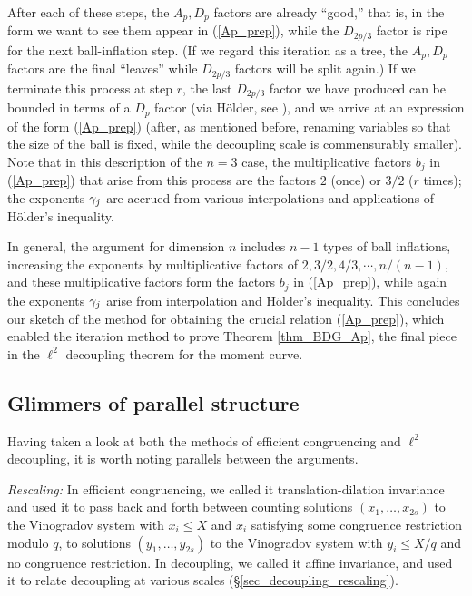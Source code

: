 \documentclass[brochure,english,12pt]{bourbaki}%
\begin{document}
After each of these steps, the $A_p,D_p$ factors are already ``good,'' that is, in the form we want to see them appear in (\ref{Ap_prep}), while the $D_{2p/3}$ factor is ripe for the next ball-inflation step. (If we regard this iteration as a tree, the $A_p,D_p$ factors are the final ``leaves'' while $D_{2p/3}$ factors will be split again.) If we terminate this process at step $r$, the last $D_{2p/3}$ factor we have produced can be bounded  in terms of a $D_p$ factor (via H\"{o}lder, see \cite[p. 664]{BDG16}), and we arrive at an expression of the form (\ref{Ap_prep}) (after, as mentioned before, renaming variables so that the size of the ball is fixed, while the decoupling scale is commensurably smaller). 
Note that in this description of the $n=3$ case, the multiplicative factors $b_j$ in (\ref{Ap_prep}) that  arise from this process are the factors $2$ (once) or $3/2$ ($r$ times); the exponents $\gamma_j$ are accrued from various interpolations and applications of H\"{o}lder's inequality.

In general, the argument for dimension $n$ includes $n-1$ types of ball inflations, increasing the exponents by multiplicative factors of $2, 3/2, 4/3, \cdots, n/(n-1)$, and these multiplicative factors form the factors $b_j$ in (\ref{Ap_prep}), while again the exponents $\gamma_j$ arise from interpolation and H\"{o}lder's inequality.
This concludes our sketch of the method for obtaining the crucial relation (\ref{Ap_prep}), which enabled the iteration method to prove Theorem \ref{thm_BDG_Ap}, the final piece in the $\ell^2$ decoupling theorem for the moment curve. 


\subsection{Glimmers of parallel structure}\label{sec_parallels}
Having taken a look at both the methods of efficient congruencing and $\ell^2$ decoupling, it is worth noting  parallels between the arguments. 


\emph{Rescaling:}
In efficient congruencing, we called it translation-dilation invariance and used it to pass back and forth between counting solutions $(x_1,\ldots, x_{2s})$ to the Vinogradov system with $x_i \leq X$ and $x_i$ satisfying some congruence restriction modulo $q$, to solutions $(y_1,\ldots, y_{2s})$ to the Vinogradov system with $y_i \leq X/q$ and no congruence restriction.
In  decoupling, we called it affine invariance, and used it to relate decoupling at various scales (\S \ref{sec_decoupling_rescaling}). 
\end{document}
